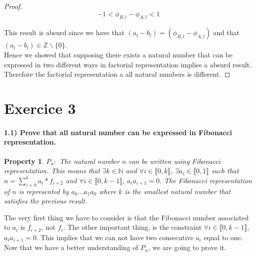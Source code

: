 \documentclass{article}
\newtheorem{prop}{Property}
\begin{document}
\begin{proof}
\begin{equation*}
  -1 < \phi_{B, l}-\phi_{A, l} < 1
\end{equation*}

This result is absurd since we have that $(a_l-b_l) = (\phi_{B, l}-\phi_{A, l})$ and that $(a_l-b_l) \in \mathbb{Z}\backslash \{0\}$. \\

Hence we showed that supposing there exists a natural number that can be expressed in two different ways in factorial representation implies a absurd result. Therefore the factorial representation a all natural numbers is different.

\end{proof}

\section*{Exercice 3}

\paragraph{1.1) Prove that all natural number can be expressed in Fibonacci representation.}

\begin{prop}
  $P_n : $ The natural number $n$ can be written using Fibonacci representation. This means that $\exists k \in \mathbb{N}$ and $\forall i \in \llbracket 0, k\rrbracket$, $ \exists a_i \in \llbracket 0, 1\rrbracket$ such that $n = \displaystyle\sum_{i=0}^k a_i*f_{i+2}$ and $\forall i \in \llbracket 0, k-1\rrbracket$, $a_ia_{i+1} = 0$. The Fibonacci representation of $n$ is represented by $a_k...a_1a_0$ where $k$ is the smallest natural number that satisfies the previous result.
\end{prop}

The very first thing we have to consider is that the Fibonacci number associated to $a_i$ is $f_{i+2}$, not $f_i$. The other important thing, is the constraint $\forall i \in \llbracket 0, k-1\rrbracket$, $a_ia_{i+1} = 0$. This implies that we can not have two consecutive $a_i$ equal to one. Now that we have a better understanding of $P_n$, we are going to prove it.\\
\end{document}

